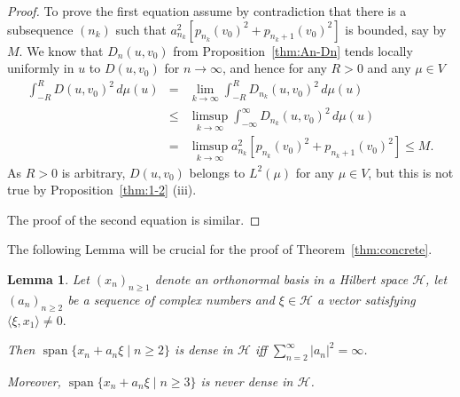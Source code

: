 \documentclass [12pt]{article}
\DeclareMathOperator{\spn}{span}
\newtheorem{lem}[thm]{Lemma}
\begin{document}
\begin{proof} To prove the first equation assume by contradiction that there is a subsequence $(n_k)$ such that $a_{n_k}^2[p_{n_k}(v_0)^2+p_{n_k+1}(v_0)^2]$ is bounded, say by $M$.  We know that $D_n(u,v_0)$ from Proposition~\ref{thm:An-Dn} tends locally uniformly in $u$ to $D(u,v_0)$ for $n\to\infty$, and hence for any $R>0$ and any $\mu\in V$ 
\begin{eqnarray*}
\int_{-R}^R D(u,v_0)^2\,d\mu(u)&=&\lim_{k\to\infty}\int_{-R}^R D_{n_k}(u,v_0)^2\,d\mu(u)\\
&\le&\limsup_{k\to\infty}\int_{-\infty}^\infty D_{n_k}(u,v_0)^2\,d\mu(u)\\
&=&\limsup_{k\to\infty} a_{n_k}^2[p_{n_k}(v_0)^2+p_{n_k+1}(v_0)^2]\le M.
\end{eqnarray*}
As $R>0$ is arbitrary, $D(u,v_0)$ belongs to $L^2(\mu)$ for any $\mu\in V$, but this is not true by Proposition~\ref{thm:1-2} (iii). 

The proof of the second equation is similar.
\end{proof}

The following Lemma will be crucial for the proof of Theorem~\ref{thm:concrete}.

\begin{lem}\label{thm:Hilbert} Let $(x_n)_{n\ge 1}$ denote an orthonormal basis in a Hilbert space $\mathcal H$, let $(a_n)_{n\ge 2}$ be a sequence of complex numbers and $\xi\in\mathcal H$ a vector satisfying $\langle \xi, x_1\rangle\neq 0.$

Then $\spn\{x_n+a_n\xi\mid n\ge 2\}$ is dense in $\mathcal H$ iff $\sum_{n=2}^\infty
|a_n|^2=\infty$.

Moreover, $\spn\{x_n+a_n\xi\mid n\ge 3\}$ is never dense in $\mathcal H$. 
\end{lem}
\end{document}
